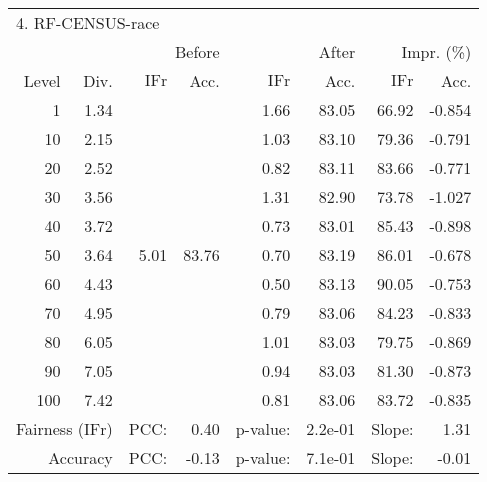 \begin{tabular}{rr||rr|rr|rr}
\multicolumn{4}{l}{4. RF-CENSUS-race} & \multicolumn{2}{c}{} & \multicolumn{2}{c}{}\\
 &  & \multicolumn{2}{r|}{Before} & \multicolumn{2}{r|}{After} & \multicolumn{2}{r}{Impr. (\%)}\\
Level & Div. & $\mathrm{IFr}$ & Acc. & $\mathrm{IFr}$ & Acc. & $\mathrm{IFr}$ & Acc.\\
\hline
1 & 1.34 & \multirow{11}{*}{5.01} & \multirow{11}{*}{83.76} & 1.66 & 83.05 & 66.92 & -0.854\\
10 & 2.15 &  &  & 1.03 & 83.10 & 79.36 & -0.791\\
20 & 2.52 &  &  & 0.82 & 83.11 & 83.66 & -0.771\\
30 & 3.56 &  &  & 1.31 & 82.90 & 73.78 & -1.027\\
40 & 3.72 &  &  & 0.73 & 83.01 & 85.43 & -0.898\\
50 & 3.64 &  &  & 0.70 & 83.19 & 86.01 & -0.678\\
60 & 4.43 &  &  & 0.50 & 83.13 & 90.05 & -0.753\\
70 & 4.95 &  &  & 0.79 & 83.06 & 84.23 & -0.833\\
80 & 6.05 &  &  & 1.01 & 83.03 & 79.75 & -0.869\\
90 & 7.05 &  &  & 0.94 & 83.03 & 81.30 & -0.873\\
100 & 7.42 &  &  & 0.81 & 83.06 & 83.72 & -0.835\\
\hline
\multicolumn{2}{r}{Fairness ($\mathrm{IFr}$)} & PCC: & \multicolumn{1}{r}{0.40} & p-value:  & \multicolumn{1}{r}{2.2e-01} & Slope:  & 1.31\\
\multicolumn{2}{r}{Accuracy} & PCC: & \multicolumn{1}{r}{-0.13} & p-value:  & \multicolumn{1}{r}{7.1e-01} & Slope:  & -0.01\\
\end{tabular}